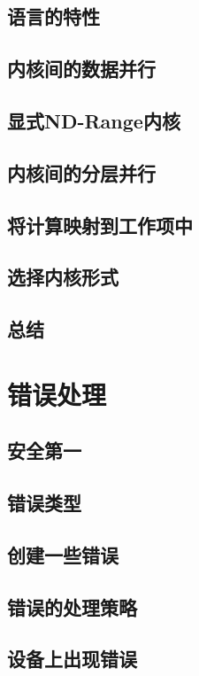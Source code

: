 \documentclass[11pt,a4paper,UTF8]{ctexart}
\begin{document}
		\subsection{语言的特性}
		
		\subsection{内核间的数据并行}
		
		\subsection{显式ND-Range内核}
		
		\subsection{内核间的分层并行}
		
		\subsection{将计算映射到工作项中}
		
		\subsection{选择内核形式}
		
		\subsection{总结}
		
	\section{错误处理}
		\subsection{安全第一}
		\subsection{错误类型}
		\subsection{创建一些错误}
		\subsection{错误的处理策略}
		\subsection{设备上出现错误}
\end{document}

